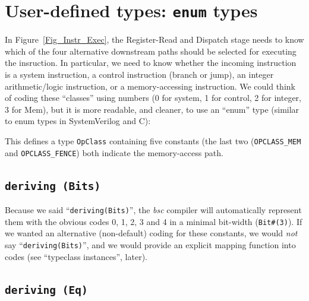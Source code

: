 \section{User-defined types: {\tt enum} types}

\label{BSV_enum_types}


In Figure~\ref{Fig_Instr_Exec}, the Register-Read and Dispatch stage
needs to know which of the four alternative downstream paths should be
selected for executing the insruction.  In particular, we need to know
whether the incoming instruction is a system instruction, a control
instruction (branch or jump), an integer arithmetic/logic instruction,
or a memory-accessing instruction.  We could think of coding these
``classes'' using numbers (0 for system, 1 for control, 2 for integer,
3 for Mem), but it is more readable, and cleaner, to use an ``enum''
type (similar to enum types in SystemVerilog and C):


This defines a type \verb|OpClass| containing five constants (the last
two (\verb|OPCLASS_MEM| and \verb|OPCLASS_FENCE|) both indicate the
memory-access path.


\subsection{{\tt deriving (Bits)}}


Because we said ``\verb|deriving(Bits)|'', the \emph{bsc} compiler
will automatically represent them with the obvious codes 0, 1, 2, 3
and 4 in a minimal bit-width (\verb|Bit#(3)|).  If we wanted an
alternative (non-default) coding for these constants, we would
\emph{not} say ``\verb|deriving(Bits)|'', and we would provide an
explicit mapping function into codes (see ``typeclass instances'',
later).


\subsection{{\tt deriving (Eq)}}


